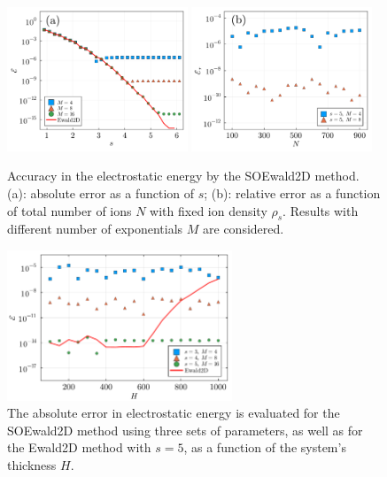 \begin{figure}[ht]
	\centering
	\includegraphics[width=0.48\textwidth]{figs/fig_error_fixn.pdf}
	\includegraphics[width=0.48\textwidth]{figs/fig_error_N.pdf}
	\caption{
		Accuracy in the electrostatic energy by the SOEwald2D method. (a): absolute error as a function of $s$; (b): relative error as a function of total number of ions $N$ with fixed ion density $\rho_{s}$. Results with different number of exponentials $M$ are considered. 
	}
	\label{fig:error_fixn}
\end{figure}

\begin{figure}[ht]
	\centering
	\includegraphics[width=0.6\textwidth]{figs/fig_error_Lz.pdf} 
	\caption{
		The absolute error in electrostatic energy is evaluated for the SOEwald2D method using three sets of parameters, as well as for the Ewald2D method with $s=5$, as a function of the system's thickness $H$. 
	}
	\label{fig:error_Lz}
\end{figure}


